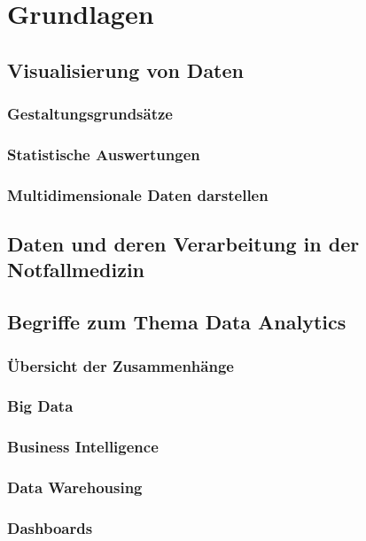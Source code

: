 \chapter{Grundlagen}
\label{chap:Grundlagen}
\minitoc\pagebreak
\lipsum[1-42]
\section{Visualisierung von Daten}
\subsection{Gestaltungsgrundsätze}
\subsection{Statistische Auswertungen}
\subsection{Multidimensionale Daten darstellen}

\section{Daten und deren Verarbeitung in der Notfallmedizin} %

\section{Begriffe zum Thema Data Analytics}
\subsection{Übersicht der Zusammenhänge}
\subsection{Big Data}
\subsection{Business Intelligence}
\subsection{Data Warehousing}
\subsection{Dashboards}
